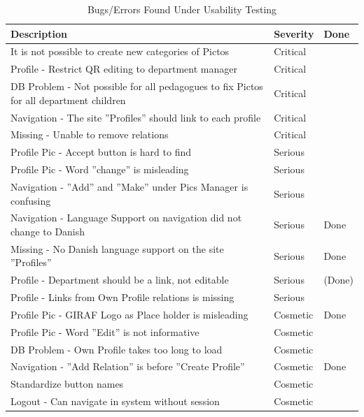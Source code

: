 \begin{table}[htbp]
	\centering
		\begin{tabularx}{\textwidth}{|X|l|l|}
			\hline
			Description & Severity & Done\\\hline\hline
			It is not possible to create new categories of Pictos & Critical &\\\hline
			Profile - Restrict QR editing to department manager & Critical &  \\\hline 
			DB Problem - Not possible for all pedagogues to fix Pictos for all department children & Critical & \\\hline
			Navigation - The site ''Profiles'' should link to each profile & Critical &\\\hline
			Missing - Unable to remove relations & Critical & \\\hline
			Profile Pic - Accept button is hard to find & Serious &\\\hline
			Profile Pic - Word ''change'' is misleading & Serious &\\\hline
			Navigation - ''Add'' and ''Make'' under Pics Manager is confusing & Serious & \\\hline
			Navigation - Language Support on navigation did not change to Danish & Serious & Done\\\hline
			Missing - No Danish language support on the site ''Profiles''& Serious & Done\\\hline
			Profile - Department should be a link, not editable & Serious & (Done)\\\hline
			Profile - Links from Own Profile relations is missing & Serious & \\\hline
			Profile Pic - GIRAF Logo as Place holder is misleading  & Cosmetic & Done\\\hline
			Profile Pic - Word ''Edit'' is not informative & Cosmetic &\\\hline
			DB Problem - Own Profile takes too long to load & Cosmetic &  \\\hline
			Navigation - ''Add Relation''  is before ''Create Profile'' & Cosmetic & Done \\\hline
			Standardize button names & Cosmetic & \\\hline
			Logout - Can navigate in system without session & Cosmetic & \\\hline
	\end{tabularx}
	\caption{Bugs/Errors Found Under Usability Testing}
	\label{tab:Bugs/Errors}
\end{table}

